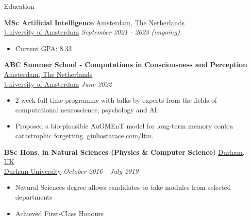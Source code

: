 \documentclass{resume} %
\begin{document}
\begin{rSection}{Education}

	{\bf MSc Artificial Intelligence} \hfill \underline{Amsterdam, The Netherlands}
	\\\href{https://www.dur.ac.uk/}{\underline{University of Amsterdam}} \hfill {\em September 2021
		- 2023 (ongoing)}
	\begin{itemize}
		\item Current GPA: 8.33
	\end{itemize}

	{\bf ABC Summer School - Computations in Consciousness and Perception} \hfill \underline{Amsterdam, The Netherlands}
	\\\href{https://www.dur.ac.uk/}{\underline{University of Amsterdam}} \hfill {\em June 2022}
	\begin{itemize}
		\item 2-week full-time programme with talks by experts from the fields of computational
		      neuroscience, psychology and AI.
		\item Proposed a bio-plausible AuGMEnT model for long-term memory
		      contra catastrophic forgetting. \href{https://www.giuliostarace.com/ltm/}{giuliostarace.com/ltm}.
	\end{itemize}

	{\bf BSc Hons. in Natural Sciences (Physics \& Computer Science)} \hfill \underline{Durham, UK}
	\\\href{https://www.dur.ac.uk/}{\underline{Durham University}} \hfill {\em October 2016 - July 2019}
	\begin{itemize}\vspace{-0.5em}
		\item Natural Sciences degree allows candidates to take modules from selected departments
		\item Achieved First-Class Honours
	\end{itemize}
\end{rSection}
\end{document}
